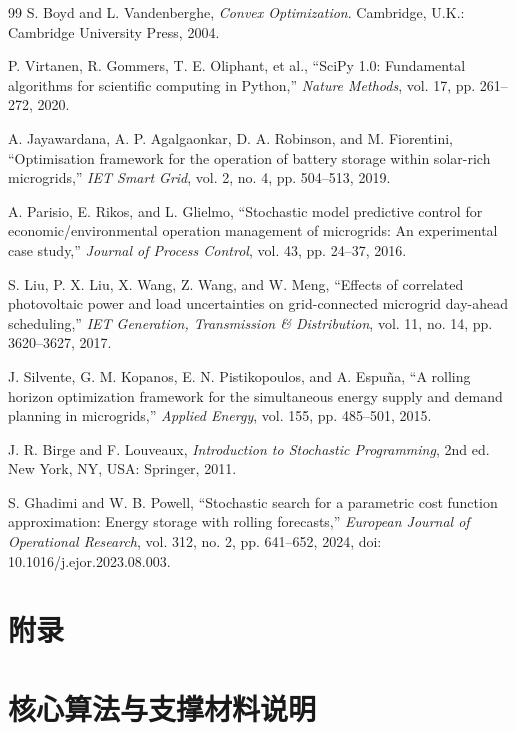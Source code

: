 \documentclass[withoutpreface,bwprint]{cumcmthesis}
\begin{document}
\begin{thebibliography}{99}
   S. Boyd and L. Vandenberghe, \emph{Convex Optimization}.
  Cambridge, U.K.: Cambridge University Press, 2004.

   P. Virtanen, R. Gommers, T. E. Oliphant, et al., ``SciPy
  1.0: Fundamental algorithms for scientific computing in Python,''
  \emph{Nature Methods}, vol. 17, pp. 261--272, 2020.

   A. Jayawardana, A. P. Agalgaonkar,
  D. A. Robinson, and M. Fiorentini, ``Optimisation framework for the operation of
  battery storage within solar-rich microgrids,'' \emph{IET Smart Grid}, vol. 2,
  no. 4, pp. 504--513, 2019.

   A. Parisio, E. Rikos, and L. Glielmo, ``Stochastic model
  predictive control for economic/environmental operation management of
  microgrids: An experimental case study,'' \emph{Journal of Process Control},
  vol. 43, pp. 24--37, 2016.

   S. Liu, P. X. Liu, X. Wang, Z. Wang, and W. Meng, ``Effects of
  correlated photovoltaic power and load uncertainties on grid-connected
  microgrid day-ahead scheduling,'' \emph{IET Generation, Transmission \&
  Distribution}, vol. 11, no. 14, pp. 3620--3627, 2017.

   J. Silvente, G. M. Kopanos, E. N. Pistikopoulos, and
  A. Espu\~na, ``A rolling horizon optimization framework for the simultaneous
  energy supply and demand planning in microgrids,'' \emph{Applied Energy},
  vol. 155, pp. 485--501, 2015.

   J. R. Birge and F. Louveaux, \emph{Introduction to
  Stochastic Programming}, 2nd ed. New York, NY, USA: Springer, 2011.

   S. Ghadimi and W. B. Powell, ``Stochastic search for a
  parametric cost function approximation: Energy storage with rolling forecasts,''
  \emph{European Journal of Operational Research}, vol. 312, no. 2,
  pp. 641--652, 2024, doi: 10.1016/j.ejor.2023.08.003.

\end{thebibliography}

\clearpage
\appendix
\section*{附录}
\section{核心算法与支撑材料说明}
\end{document}
